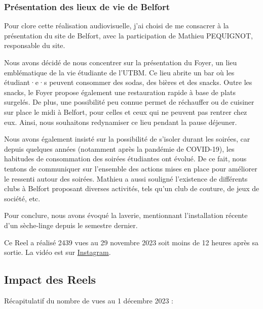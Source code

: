 \subsubsection{Présentation des lieux de vie de Belfort}

Pour clore cette réalisation audiovisuelle, j'ai choisi de me consacrer à la présentation du site de Belfort, avec la participation de Mathieu PEQUIGNOT, responsable du site.

Nous avons décidé de nous concentrer sur la présentation du Foyer, un lieu emblématique de la vie étudiante de l'\gls{UTBM}.
Ce lieu abrite un bar où les étudiant·e·s peuvent consommer des sodas, des bières et des snacks.
Outre les snacks, le Foyer propose également une restauration rapide à base de plats surgelés.
De plus, une possibilité peu connue permet de réchauffer ou de cuisiner sur place le midi à Belfort, pour celles et ceux qui ne peuvent pas rentrer chez eux.
Ainsi, nous souhaitons redynamiser ce lieu pendant la pause déjeuner.

Nous avons également insisté sur la possibilité de s'isoler durant les soirées, car depuis quelques années (notamment après la pandémie de COVID-19), les habitudes de consommation des soirées étudiantes ont évolué.
De ce fait, nous tentons de communiquer sur l'ensemble des actions mises en place pour améliorer le ressenti autour des soirées.
Mathieu a aussi souligné l'existence de différents clubs à Belfort proposant diverses activités, tels qu'un club de couture, de jeux de société, etc.

Pour conclure, nous avons évoqué la laverie, mentionnant l'installation récente d'un sèche-linge depuis le semestre dernier.

Ce Reel a réalisé 2439 vues au 29 novembre 2023 soit moins de 12 heures après sa sortie.
La vidéo est sur \href{https://www.instagram.com/reel/C0OWkRusrx2/?utm_source=ig_web_copy_link&igshid=MzRlODBiNWFlZA==}{Instagram}.


\subsection{Impact des Reels}\label{subsec:impacte-des-reels}


Récapitulatif du nombre de vues au 1 décembre 2023 :

